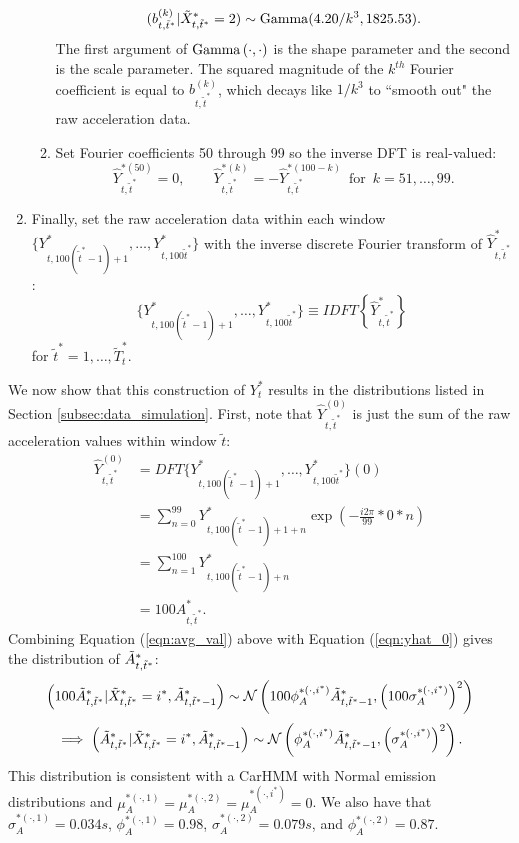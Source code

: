 \begin{enumerate}
\begin{enumerate}
\begin{align}
\begin{split}
    	(b^{(k)}_{t,\tilde t^*}|\tilde X^*_{t,\tilde t^*} = 2) &\sim {\rm{Gamma}}(4.20/k^3, 1825.53). \\ 
    \end{split}
    \label{eqn:bdist}
    \end{align}
    The first argument of ${\rm{Gamma}}\left(\cdot,\cdot\right)$ is the shape parameter and the second is the scale parameter. The squared magnitude of the $k^{th}$ Fourier coefficient is equal to $b^{(k)}_{t,\tilde t^*}$, which decays like $1/k^3$ to ``smooth out" the raw acceleration data.
    \item Set Fourier coefficients 50 through 99 so the inverse DFT is real-valued:
    $$
    \hat{Y}^{*(50)}_{t,\tilde t^*} = 0, \qquad
	\hat{Y}^{*(k)}_{t,\tilde t^*} = -\hat{Y}^{*(100-k)}_{t,\tilde t^*} \enspace \text{for} \enspace k = 51,\ldots,99.
    $$
    \end{enumerate}
    \item Finally, set the raw acceleration data within each window $\{Y^*_{t,100(\tilde t^* - 1) + 1},\ldots,Y^*_{t,100\tilde t^*}\}$ with the inverse discrete Fourier transform of $\hat{Y}^*_{t,\tilde t^*}$:
    $$\{Y^*_{t,100(\tilde t^* - 1) + 1},\ldots,Y^*_{t,100\tilde t^*}\} \equiv IDFT\left\{\hat{Y}^*_{t,\tilde t^*}\right\}$$
    for $\tilde t^* = 1,\ldots,\tilde T^*_t.$
\end{enumerate}

We now show that this construction of $Y^*_t$ results in the distributions listed in Section \ref{subsec:data_simulation}. First, note that $\hat{Y}^{(0)}_{t,\tilde t^*}$ is just the sum of the raw acceleration values within window $\tilde t$:
%
\begin{align}
    \hat{Y}^{(0)}_{t,\tilde t^*} &=
    DFT\{Y^*_{t,100(\tilde t^* - 1) + 1},\ldots,Y^*_{t,100\tilde t^*}\}(0) \nonumber \\
    &= \sum_{n=0}^{99} Y^*_{t,100(\tilde t^* - 1) + 1 + n} \exp\left(-\frac{i2\pi}{99}*0*n\right) \nonumber \\
    &= \sum_{n=1}^{100} Y^*_{t,100(\tilde t^* - 1) + n} \nonumber \\
    &= 100A^*_{t,\tilde t^*}.
    \label{eqn:avg_val}
\end{align}
%
Combining Equation (\ref{eqn:avg_val}) above with Equation (\ref{eqn:yhat_0}) gives the distribution of $\tilde{A}^*_{t,\tilde t^*}$: 
%
$$\left(100\tilde{A}^*_{t,\tilde t^*} | \tilde X^*_{t,\tilde t^*} = i^*, \tilde{A}^*_{t,\tilde t^*-1} \right) \sim \mathcal{N} \left(100\phi_A^{*(\cdot,i^*)} \tilde{A}^*_{t,\tilde t^*-1}, \left(100\sigma_A^{*(\cdot,i^*)}\right)^2 \right)$$
%
$$\implies \left(\tilde{A}^*_{t,\tilde t^*} | \tilde X^*_{t,\tilde t^*} = i^*, \tilde{A}^*_{t,\tilde t^*-1} \right) \sim \mathcal{N} \left(\phi_A^{*(\cdot,i^*)} \tilde{A}^*_{t,\tilde t^*-1}, \left(\sigma_A^{*(\cdot,i^*)}\right)^2 \right).$$
%
This distribution is consistent with a CarHMM with Normal emission distributions and $\mu_A^{*(\cdot,1)} = \mu_A^{*(\cdot,2)} = \mu_A^{*(\cdot,i^*)} = 0$. We also have that $\sigma_A^{*(\cdot,1)} = 0.034s$, $\phi_A^{*(\cdot,1)} = 0.98$, $\sigma_A^{*(\cdot,2)} = 0.079s$, and $\phi_A^{*(\cdot,2)} = 0.87$.

